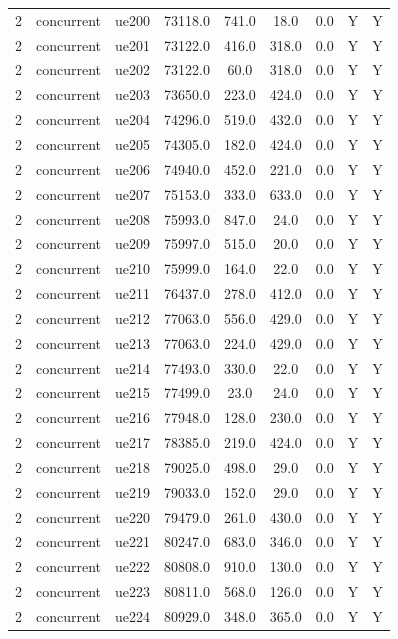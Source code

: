\begin{table}[ht]
\begin{tabular}{|c|c|c|c|c|c|c|c|c|}
2 & concurrent & ue200 & 73118.0 & 741.0 & 18.0 & 0.0 & Y & Y \\
2 & concurrent & ue201 & 73122.0 & 416.0 & 318.0 & 0.0 & Y & Y \\
2 & concurrent & ue202 & 73122.0 & 60.0 & 318.0 & 0.0 & Y & Y \\
2 & concurrent & ue203 & 73650.0 & 223.0 & 424.0 & 0.0 & Y & Y \\
2 & concurrent & ue204 & 74296.0 & 519.0 & 432.0 & 0.0 & Y & Y \\
2 & concurrent & ue205 & 74305.0 & 182.0 & 424.0 & 0.0 & Y & Y \\
2 & concurrent & ue206 & 74940.0 & 452.0 & 221.0 & 0.0 & Y & Y \\
2 & concurrent & ue207 & 75153.0 & 333.0 & 633.0 & 0.0 & Y & Y \\
2 & concurrent & ue208 & 75993.0 & 847.0 & 24.0 & 0.0 & Y & Y \\
2 & concurrent & ue209 & 75997.0 & 515.0 & 20.0 & 0.0 & Y & Y \\
2 & concurrent & ue210 & 75999.0 & 164.0 & 22.0 & 0.0 & Y & Y \\
2 & concurrent & ue211 & 76437.0 & 278.0 & 412.0 & 0.0 & Y & Y \\
2 & concurrent & ue212 & 77063.0 & 556.0 & 429.0 & 0.0 & Y & Y \\
2 & concurrent & ue213 & 77063.0 & 224.0 & 429.0 & 0.0 & Y & Y \\
2 & concurrent & ue214 & 77493.0 & 330.0 & 22.0 & 0.0 & Y & Y \\
2 & concurrent & ue215 & 77499.0 & 23.0 & 24.0 & 0.0 & Y & Y \\
2 & concurrent & ue216 & 77948.0 & 128.0 & 230.0 & 0.0 & Y & Y \\
2 & concurrent & ue217 & 78385.0 & 219.0 & 424.0 & 0.0 & Y & Y \\
2 & concurrent & ue218 & 79025.0 & 498.0 & 29.0 & 0.0 & Y & Y \\
2 & concurrent & ue219 & 79033.0 & 152.0 & 29.0 & 0.0 & Y & Y \\
2 & concurrent & ue220 & 79479.0 & 261.0 & 430.0 & 0.0 & Y & Y \\
2 & concurrent & ue221 & 80247.0 & 683.0 & 346.0 & 0.0 & Y & Y \\
2 & concurrent & ue222 & 80808.0 & 910.0 & 130.0 & 0.0 & Y & Y \\
2 & concurrent & ue223 & 80811.0 & 568.0 & 126.0 & 0.0 & Y & Y \\
2 & concurrent & ue224 & 80929.0 & 348.0 & 365.0 & 0.0 & Y & Y \\

\end{tabular}
\end{table}
